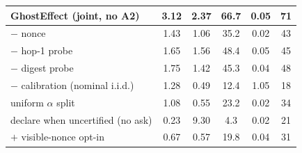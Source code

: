 \begin{table}[t]
\begin{tabular}{@{}l ccccc@{}}
\textbf{GhostEffect} (joint, no A2) & 3.12 & 2.37 & 66.7 & 0.05 & 71 \\
\midrule
\quad $-$ nonce & 1.43 & 1.06 & 35.2 & 0.02 & 43 \\
\quad $-$ hop-1 probe & 1.65 & 1.56 & 48.4 & 0.05 & 45 \\
\quad $-$ digest probe & 1.75 & 1.42 & 45.3 & 0.04 & 48 \\
\quad $-$ calibration (nominal i.i.d.) & 1.28 & 0.49 & 12.4 & 1.05 & 18 \\
\quad uniform $\alpha$ split & 1.08 & 0.55 & 23.2 & 0.02 & 34 \\
\quad declare when uncertified (no ask) & 0.23 & 9.30 & 4.3 & 0.02 & 21 \\
\quad $+$ visible-nonce opt-in & 0.67 & 0.57 & 19.8 & 0.04 & 31 \\
\bottomrule
\end{tabular}
\end{table}
